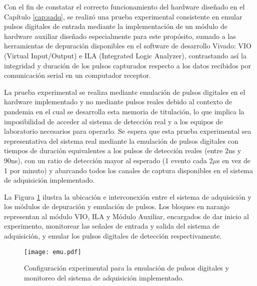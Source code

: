 
Con el fin de constatar el correcto funcionamiento del hardware diseñado en el Capítulo \ref{cap:sadq}, se realizó una prueba experimental consistente en emular pulsos digitales de entrada mediante la implementación de un módulo de hardware auxiliar diseñado especialmente para este propósito, sumado a las herramientas de depuración disponibles en el software de desarrollo Vivado: VIO (Virtual Input/Output)\cite{XilinxVirtualSuite} e ILA (Integrated Logic Analyzer)\cite{XilinxIntegratedPG172}, contrastando así la integridad y duración de los pulsos capturados respecto a los datos recibidos por comunicación serial en un computador receptor. 

La prueba experimental se realiza mediante emulación de pulsos digitales en el hardware implementado y no mediante pulsos reales debido al contexto de pandemia en el cual se desarrolla esta memoria de titulación, lo que implica la imposibilidad de acceder al sistema de detección real y a los equipos de laboratorio necesarios para operarlo. Se espera que esta prueba experimental sea representativa del sistema real mediante la emulación de pulsos digitales con tiempos de duración equivalentes a los pulsos de detección reales (entre 2ns y 90ns), con un ratio de detección mayor al esperado (1 evento cada 2$\mu$s en vez de 1 por minuto) y abarcando todos los canales de captura disponibles en el sistema de adquisición implementado.

La Figura \ref{fig:emu} ilustra la ubicación e interconexión entre el sistema de adquisición y los módulos de depuración y emulación de pulsos. Los bloques en naranjo representan al módulo VIO, ILA y Módulo Auxiliar, encargados de dar inicio al experimento, monitorear las señales de entrada y salida del sistema de adquisición, y emular los pulsos digitales de detección respectivamente.

\begin{figure}[ht]
	\centering
	\texttt{[image: emu.pdf]}
	\caption{Configuración experimental para la emulación de pulsos digitales y monitoreo del sistema de adquisición implementado.}
	\label{fig:emu}
\end{figure}


